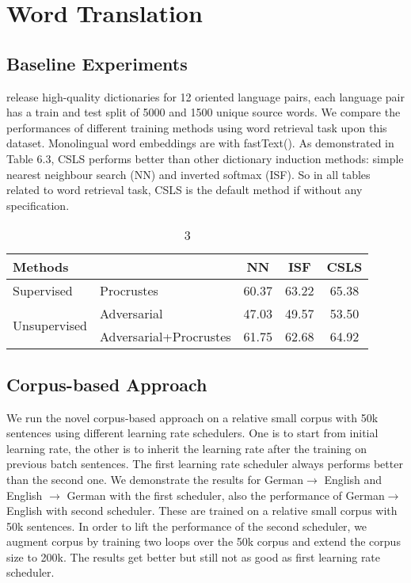 \section{Word Translation}
\subsection{Baseline Experiments}
 \cite{conneau2017word} release high-quality dictionaries for 12 oriented language pairs, each language pair has a train and test split of 5000 and 1500 unique source words. We compare the performances of different training methods using word retrieval task upon this dataset. Monolingual word embeddings are with fastText(\cite{bojanowski2016enriching}). As demonstrated in Table 6.3, CSLS performs better than other dictionary induction methods: simple nearest neighbour search (NN) and inverted softmax (ISF). So in all tables related to word retrieval task, CSLS is the default method if without any specification.

\begin{table}[H]
	\centering
	\begin{tabular}{llccc}
		\hline
		\multicolumn{2}{l}{Methods}                           & NN    & ISF   & CSLS  \\ \hline
		Supervised                    & Procrustes             & 60.37 & 63.22 & 65.38 \\ \hline
		\multirow{2}{*}{Unsupervised} & Adversarial            & 47.03 & 49.57 & 53.50 \\ \cline{2-5} 
		& Adversarial+Procrustes & 61.75 & 62.68 & 64.92 \\ \hline
	\end{tabular}
	\caption{3}
\end{table}


\subsection{Corpus-based Approach}
We run the novel corpus-based approach on a relative small corpus with 50k sentences using different learning rate schedulers. One is to start from initial learning rate, the other is to inherit the learning rate after the training on previous batch sentences. The first learning rate scheduler always performs better than the second one. We demonstrate the results for German$\rightarrow$ English and English $\rightarrow$ German with the first scheduler, also the performance of  German$\rightarrow$ English with second scheduler. These are trained on a relative small corpus with 50k sentences. In order to lift the performance of the second scheduler, we augment corpus by training two loops over the 50k corpus and extend the corpus size to 200k. The results get better but still not as good as first learning rate scheduler. 
